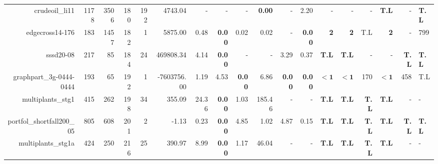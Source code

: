\begin{table*}[t]
\begin{tabular}{|r|r|r|r|r||r||r|r|r|r|r||r|r|r|r|r|r|}
                    crudeoil\_li11 &         1178 &          3506 &          180 &           192 &             4743.04 &              - &              - &              - &  \textbf{0.00} &              - &           2.20 &                  - &                  - &                  - &       \textbf{T.L} &            - & \textbf{T.L} \\ 
                   edgecross14-176 &          183 &          1457 &          182 &             1 &             5875.00 &           0.48 &  \textbf{0.00} &           0.02 &           0.02 &              - &  \textbf{0.00} &         \textbf{2} &         \textbf{2} &                T.L &         \textbf{2} &            - &          799 \\ 
                         sssd20-08 &          217 &            85 &          184 &            24 &           469808.34 &           4.14 &  \textbf{0.00} &              - &              - &           3.29 &           0.37 &       \textbf{T.L} &       \textbf{T.L} &                  - &                  - & \textbf{T.L} & \textbf{T.L} \\ 
           graphpart\_3g-0444-0444 &          193 &            65 &          192 &             1 &         -7603756.00 &           1.19 &           4.53 &  \textbf{0.00} &           6.86 &  \textbf{0.00} &  \textbf{0.00} &         $\bm{< 1}$ &         $\bm{< 1}$ &                170 &         $\bm{< 1}$ &          458 &          T.L \\ 
                 multiplants\_stg1 &          415 &           262 &          198 &            34 &              355.09 &          24.36 &  \textbf{0.00} &           1.03 &         185.46 &              - &              - &       \textbf{T.L} &       \textbf{T.L} &       \textbf{T.L} &       \textbf{T.L} &            - &            - \\ 
         portfol\_shortfall200\_05 &          805 &           608 &          201 &             2 &               -1.13 &           0.23 &  \textbf{0.00} &           4.85 &           1.02 &           4.87 &           0.15 &       \textbf{T.L} &       \textbf{T.L} &       \textbf{T.L} &       \textbf{T.L} & \textbf{T.L} & \textbf{T.L} \\ 
                multiplants\_stg1a &          424 &           250 &          216 &            25 &              390.97 &           8.99 &  \textbf{0.00} &           1.17 &          46.04 &              - &              - &       \textbf{T.L} &       \textbf{T.L} &       \textbf{T.L} &       \textbf{T.L} &            - &            - \\ 

\end{tabular}
\end{table*}
